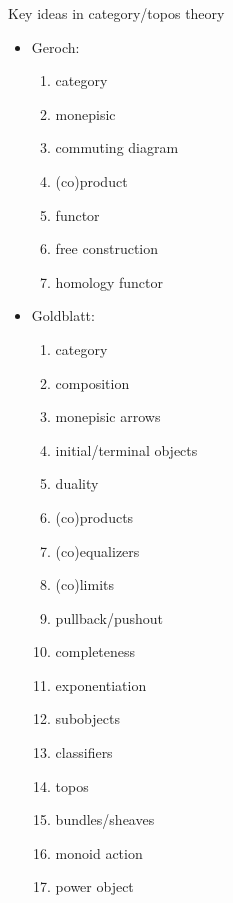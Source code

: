 \begin{plSection}{Key ideas in category/topos theory}
\begin{itemize}
\item Geroch:\cite{Geroch:1985:MathPhysics}
\begin{enumerate}
  \item category
  \item monepisic
  \item commuting diagram
  \item (co)product
  \item functor
  \item free construction
  \item homology functor
\end{enumerate}

\item Goldblatt:~\cite{Goldblatt:1984:Topoi}
\begin{enumerate}
  \item category
  \item composition
  \item monepisic arrows
  \item initial/terminal objects
  \item duality
  \item (co)products
  \item (co)equalizers
  \item (co)limits
  \item pullback/pushout
  \item completeness
  \item exponentiation
  \item subobjects
  \item classifiers
  \item topos
  \item bundles/sheaves
  \item monoid action
  \item power object
\end{enumerate}


\end{itemize}
\end{plSection}
